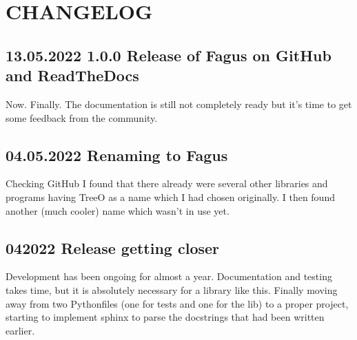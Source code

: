 \documentclass[a4paper,10pt,english]{sphinxmanual}
\begin{document}
\begin{fulllineitems}

\begin{fulllineitems}
\label{\detokenize{fagus.utils:fagus.utils.FagusMeta.__module__}}
\pysigstartsignatures
{}
\pysigstopsignatures
\end{fulllineitems}


\end{fulllineitems}


\sphinxstepscope


\chapter{CHANGELOG}
\label{\detokenize{CHANGELOG:changelog}}\label{\detokenize{CHANGELOG::doc}}

\section{13.05.2022 1.0.0 Release of Fagus on GitHub and ReadTheDocs}
\label{\detokenize{CHANGELOG:release-of-fagus-on-github-and-readthedocs}}
\sphinxAtStartPar
Now. Finally. The documentation is still not completely ready but it’s time to get some feedback from the community.


\section{04.05.2022 Renaming to Fagus}
\label{\detokenize{CHANGELOG:renaming-to-fagus}}
\sphinxAtStartPar
Checking GitHub I found that there already were several other libraries and programs having TreeO as a name which I had chosen originally. I then found another (much cooler) name which wasn’t in use yet.


\section{04\sphinxhyphen{}2022 Release getting closer}
\label{\detokenize{CHANGELOG:release-getting-closer}}
\sphinxAtStartPar
Development has been ongoing for almost a year. Documentation and testing takes time, but it is absolutely necessary for a library like this. Finally moving away from two Python\sphinxhyphen{}files (one for tests and one for the lib) to a proper \sphinxhyphen{}project, starting to implement sphinx to parse the docstrings that had been written earlier.
\end{document}

